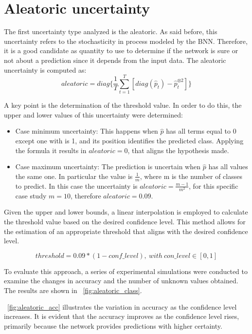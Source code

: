 \section{Aleatoric uncertainty}

The first uncertainty type analyzed is the aleatoric. As said before, this uncertainty refers to the stochasticity in process modeled by the BNN. Therefore, it is a good candidate as quantity to use to determine if the network is sure or not about a prediction since it depends from the input data. The aleatoric uncertainty is computed as:
\begin{equation}
	aleatoric = diag\{\frac{1}{T} \sum_{t=1}^{T} [diag(\hat{p}_t) - \hat{p}_t^{\otimes 2}]\}
\end{equation}

A key point is the determination of the threshold value. In order to do this, the upper and lower values of this uncertainty  were determined:

\begin{itemize}
	\item Case minimum uncertainty: This happens when $\hat{p}$ has all terms equal to 0 except one with is 1, and its position identifies the predicted class. Applying the formula it results in $aleatoric = 0$, that aligns the hypothesis made. 
	\item Case maximum uncertainty: The prediction is uncertain when $\hat{p}$ has all values the same one. In particular the value is $\frac{1}{m}$, where m is the number of classes to predict. In this case the uncertainty is $aleatoric = \frac{m-1}{m^2}$, for this specific case study $m = 10$, therefore $aleatoric = 0.09$.
\end{itemize}

Given the upper and lower bounds, a linear interpolation is employed to calculate the threshold value based on the desired confidence level. This method allows for the estimation of an appropriate threshold that aligns with the desired confidence level. 

\[
	threshold = 0.09 * (1 - conf \_ level), \ with \ con \_ level \in [0,1]
\]


To evaluate this approach, a series of experimental simulations were conducted to examine the changes in accuracy and the number of unknown values obtained. The results are shown in \Fig~\ref{fig:aleatoric_class}.

\Fig~\ref{fig:aleatoric_acc} illustrates the variation in accuracy as the confidence level increases. It is evident that the accuracy improves as the confidence level rises, primarily because the network provides predictions with higher certainty.

